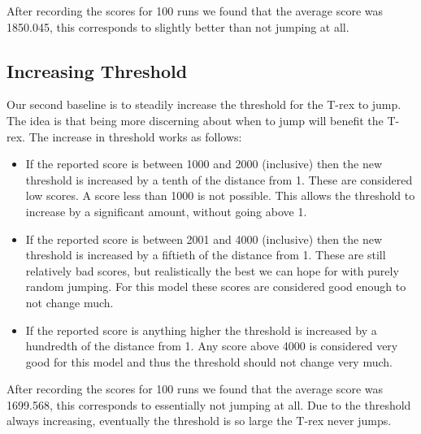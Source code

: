 \documentclass{scrartcl}
\begin{document}
After recording the scores for 100 runs we found that the average score was
1850.045, this corresponds to slightly better than not jumping at all.

\subsection{Increasing Threshold}
Our second baseline is to steadily increase the threshold for the T-rex to jump.
The idea is that being more discerning about when to jump will benefit the
T-rex. The increase in threshold works as follows:
\begin{itemize}
  \item If the reported score is between 1000 and 2000 (inclusive) then the new
    threshold is increased by a tenth of the distance from 1. These are
    considered low scores. A score less than 1000 is not possible. This allows
    the threshold to increase by a significant amount, without going above 1.
  \item If the reported score is between 2001 and 4000 (inclusive) then the new
    threshold is increased by a fiftieth of the distance from 1. These are still
    relatively bad scores, but realistically the best we can hope for with
    purely random jumping. For this model these scores are considered good
    enough to not change much.
  \item If the reported score is anything higher the threshold is increased by a
    hundredth of the distance from 1. Any score above 4000 is considered very
    good for this model and thus the threshold should not change very much.
\end{itemize}

After recording the scores for 100 runs we found that the average score was
1699.568, this corresponds to essentially not jumping at all. Due to the
threshold always increasing, eventually the threshold is so large the T-rex
never jumps.
\end{document}
